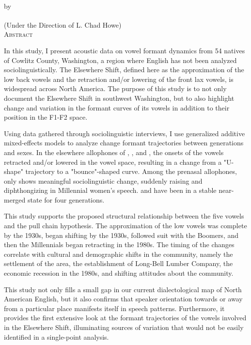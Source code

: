 \setcounter{page}{0}


\vspace*{18pt}
\begin{center}
  \textsc{\Large{\dissertationtitle}}\\[18pt]  %
  by\\[18pt]
  \textsc{\Large\myname}\\[12pt]
  (Under the Direction of L. Chad Howe)\\[12pt]
  \textsc{Abstract}
\end{center}


In this study, I present acoustic data on vowel formant dynamics from 54 natives of Cowlitz County, Washington, a region where English has not been analyzed sociolinguistically. The Elsewhere Shift, defined here as the approximation of the low back vowels and the retraction and/or lowering of the front lax vowels, is widespread across North America. The purpose of this study is to not only document the Elsewhere Shift in southwest Washington, but to also highlight change and variation in the formant curves of its vowels in addition to their position in the F1-F2 space.

Using data gathered through sociolinguistic interviews, I use generalized additive mixed-effects models to analyze change formant trajectories between generations and sexes. In the elsewhere allophones of \trap, \dress, and \kit, the onsets of the vowels retracted and/or lowered in the vowel space, resulting in a change from a "U-shape" trajectory to a "bounce"-shaped curve. Among the prenasal allophones, only \ban shows meaningful sociolinguistic change, suddenly raising and diphthongizing in Millennial women's speech. \lot and \thought have been in a stable near-merged state for four generations.

This study supports the proposed structural relationship between the five vowels and the pull chain hypothesis. The approximation of the low vowels was complete by the 1930s, \bat began shifting by the 1930s, \bet followed suit with the Boomers, and then the Millennials began retracting \bit in the 1980s. The timing of the changes correlate with cultural and demographic shifts in the community, namely the settlement of the area, the establishment of Long-Bell Lumber Company, the economic recession in the 1980s, and shifting attitudes about the community.

This study not only fills a small gap in our current dialectological map of North American English, but it also confirms that speaker orientation towards or away from a particular place manifests itself in speech patterns. Furthermore, it provides the first extensive look at the formant trajectories of the vowels involved in the Elsewhere Shift, illuminating sources of variation that would not be easily identified in a single-point analysis.


